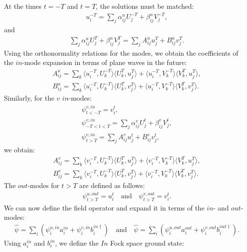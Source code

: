 \documentclass[12pt]{article}
\numberwithin{equation}{section}
\begin{document}
At the times $t = -T$ and $t = T$, the solutions must be matched:
\begin{align}
u^{-T}_i = \sum_j \alpha^u_{ij} U^{-T}_j + \beta^u_{ij} V^{-T}_j,
\end{align}
and
\begin{align}
    \sum_j \alpha^u_{ij} U^{T}_j + \beta^u_{ij} V^{T}_j = \sum_j A^u_{ij} u^{T}_j + B^u_{ij} v^{T}_j.
\end{align}
Using the orthonormality relations for the modes, we obtain the coefficients of the $in$-mode expansion in terms of plane waves in the future:
\begin{gather}
    A^u_{ij} = \sum_k \langle u^{-T}_i, U^{-T}_k \rangle \langle U^{T}_k, u^T_j \rangle + \langle u^{-T}_i, V^{-T}_k \rangle \langle V^{T}_k, u^T_j \rangle, \\
    B^u_{ij} = \sum_k \langle u^{-T}_i, U^{-T}_k \rangle \langle U^{T}_k, v^T_j \rangle + \langle u^{-T}_i, V^{-T}_k \rangle \langle V^{T}_k, v^T_j \rangle.
\end{gather}
Similarly, for the $v$ $in$-modes:
\begin{gather}
    \psi^{v,in}_{t<-T} = v^t_i, \\
    \psi^{v,in}_{-T<t<T} = \sum_j \alpha^v_{ij} U^{t}_j + \beta^v_{ij} V^{t}_j, \\
    \psi^{v,in}_{t>T} = \sum_j A^v_{ij} u^{t}_j + B^v_{ij} v^{t}_j,
\end{gather}
we obtain:
\begin{gather}
    A^v_{ij} = \sum_k \langle v^{-T}_i, U^{-T}_k \rangle \langle U^{T}_k, u^T_j \rangle + \langle v^{-T}_i, V^{-T}_k \rangle \langle V^{T}_k, u^T_j \rangle, \\
    B^v_{ij} = \sum_k \langle v^{-T}_i, U^{-T}_k \rangle \langle U^{T}_k, v^T_j \rangle + \langle v^{-T}_i, V^{-T}_k \rangle \langle V^{T}_k, v^T_j \rangle.
\end{gather}
The $out$-modes for $t > T$ are defined as follows:
\begin{align}
   \psi^{u,out}_{t>T} = u^t_i \quad \text{and} \quad \psi^{v,out}_{t>T} = v^t_i.
\end{align}
We can now define the field operator and expand it in terms of the $in$- and $out$-modes:
\begin{align}
    \hat{\psi} = \sum_i \left( \psi^{u,in}_i a^{in}_i + \psi^{v,in}_i b_i^{in\dagger} \right) \quad \text{and} \quad \hat{\psi} = \sum_i \left( \psi^{u,out}_i a^{out}_i + \psi^{v,out}_i b_i^{out\dagger} \right).
\end{align}
Using $a^{in}_i$ and $b^{in}_i$, we define the $In$ Fock space ground state:
\end{document}
